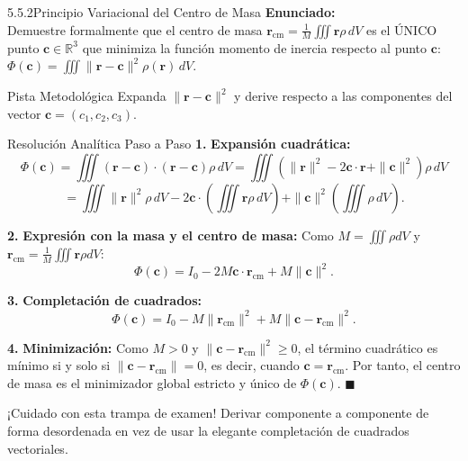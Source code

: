 \documentclass[11pt,a4paper]{article}
\begin{document}
\begin{nivelbox}{5.5.2}{Principio Variacional del Centro de Masa}
\textbf{Enunciado:}\\
Demuestre formalmente que el centro de masa $\mathbf{r}_{\text{cm}} = \frac{1}{M} \iiint \mathbf{r} \rho \, dV$ es el ÚNICO punto $\mathbf{c} \in \mathbb{R}^3$ que minimiza la función momento de inercia respecto al punto $\mathbf{c}$: $\Phi(\mathbf{c}) = \iiint \|\mathbf{r} - \mathbf{c}\|^2 \rho(\mathbf{r}) \, dV$.

\begin{observacionbox}{Pista Metodológica}
Expanda $\|\mathbf{r} - \mathbf{c}\|^2$ y derive respecto a las componentes del vector $\mathbf{c} = (c_1, c_2, c_3)$.
\end{observacionbox}

\begin{ejerciciobox}{Resolución Analítica Paso a Paso}
\smallskip\noindent\textbf{1.} \textbf{Expansión cuadrática:}
\[\Phi(\mathbf{c}) = \iiint (\mathbf{r} - \mathbf{c}) \cdot (\mathbf{r} - \mathbf{c}) \rho \, dV = \iiint (\|\mathbf{r}\|^2 - 2\mathbf{c} \cdot \mathbf{r} + \|\mathbf{c}\|^2) \rho \, dV\]
\[= \iiint \|\mathbf{r}\|^2 \rho \, dV - 2\mathbf{c} \cdot \left( \iiint \mathbf{r} \rho \, dV \right) + \|\mathbf{c}\|^2 \left( \iiint \rho \, dV \right).\]

\smallskip\noindent\textbf{2.} \textbf{Expresión con la masa y el centro de masa:}
Como $M = \iiint \rho dV$ y $\mathbf{r}_{\text{cm}} = \frac{1}{M} \iiint \mathbf{r} \rho dV$:
\[\Phi(\mathbf{c}) = I_0 - 2M \mathbf{c} \cdot \mathbf{r}_{\text{cm}} + M \|\mathbf{c}\|^2.\]

\smallskip\noindent\textbf{3.} \textbf{Completación de cuadrados:}
\[\Phi(\mathbf{c}) = I_0 - M \|\mathbf{r}_{\text{cm}}\|^2 + M \|\mathbf{c} - \mathbf{r}_{\text{cm}}\|^2.\]

\smallskip\noindent\textbf{4.} \textbf{Minimización:}
Como $M > 0$ y $\|\mathbf{c} - \mathbf{r}_{\text{cm}}\|^2 \ge 0$, el término cuadrático es mínimo si y solo si $\|\mathbf{c} - \mathbf{r}_{\text{cm}}\| = 0$, es decir, cuando $\mathbf{c} = \mathbf{r}_{\text{cm}}$.
Por tanto, el centro de masa es el minimizador global estricto y único de $\Phi(\mathbf{c})$. $\blacksquare$
\end{ejerciciobox}

\begin{errorbox}{¡Cuidado con esta trampa de examen!}
Derivar componente a componente de forma desordenada en vez de usar la elegante completación de cuadrados vectoriales.
\end{errorbox}
\end{nivelbox}
\bigskip
\end{document}
